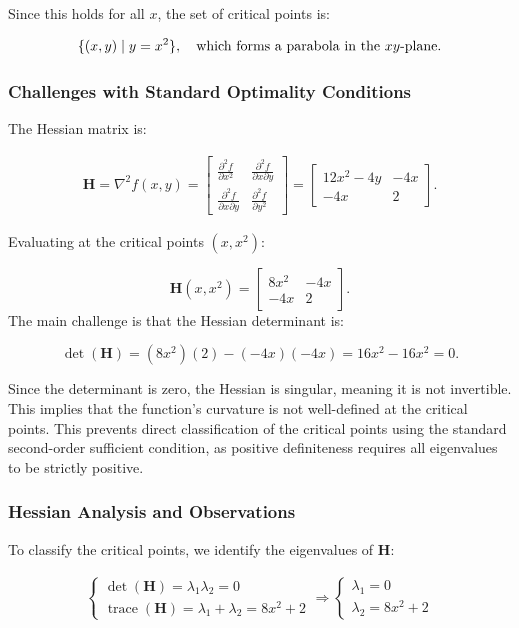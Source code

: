 \documentclass[12pt]{article}
\DeclareMathOperator{\tr}{trace}
\begin{document}
Since this holds for all \( x \), the set of critical points is:

\[
\{(x, y) \mid y = x^2\}, \quad \text{which forms a parabola in the \( xy \)-plane.}
\]

\subsubsection{Challenges with Standard Optimality Conditions}

The Hessian matrix is:

\begin{align*}
\mathbf{H} = \nabla^2 f(x,y) = 
\begin{bmatrix}
\frac{\partial^2 f}{\partial x^2} & \frac{\partial^2 f}{\partial x \partial y} \\
\frac{\partial^2 f}{\partial x \partial y} & \frac{\partial^2 f}{\partial y^2}
\end{bmatrix}
=
\begin{bmatrix}
12x^2-4y & -4x \\
-4x & 2
\end{bmatrix}.
\end{align*}

Evaluating at the critical points \( (x, x^2) \):

\[
\mathbf{H}(x, x^2) = 
\begin{bmatrix}
8x^2 & -4x \\
-4x & 2
\end{bmatrix}.
\]
The main challenge is that the Hessian determinant is:

\[
\det(\mathbf{H}) = (8x^2)(2) - (-4x)(-4x) = 16x^2 - 16x^2 = 0.
\]

Since the determinant is zero, the Hessian is singular, meaning it is not invertible. This implies that the function's curvature is not well-defined at the critical points. This prevents direct classification of the critical points using the standard second-order sufficient condition, as positive definiteness requires all eigenvalues to be strictly positive.

\subsubsection{Hessian Analysis and Observations}

To classify the critical points, we identify the eigenvalues of \( \mathbf{H} \):

\begin{align*}
\begin{cases} 
\det(\mathbf{H}) = \lambda_1\lambda_2 = 0 \\
\tr(\mathbf{H}) = \lambda_1 + \lambda_2 = 8x^2 + 2
\end{cases}
\Rightarrow
\begin{cases}
\lambda_1 = 0 \\ \lambda_2 = 8x^2 + 2
\end{cases}
\end{align*}
\end{document}
